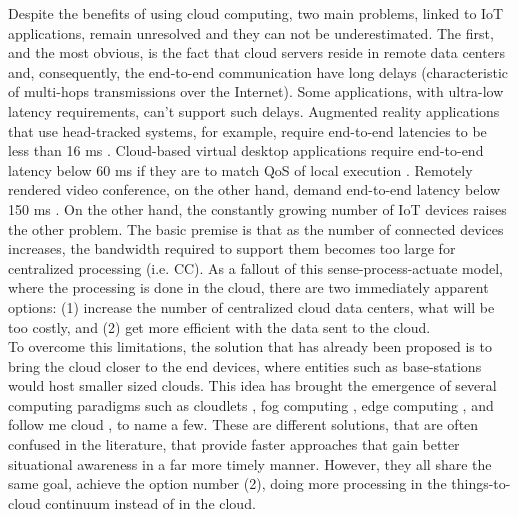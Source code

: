 \noindent\tab Despite the benefits of using cloud computing, two main problems, linked to IoT applications, remain unresolved and they can not be underestimated. The first, and the most obvious, is the fact that cloud servers reside in remote data centers and, consequently, the end-to-end communication have long delays (characteristic of multi-hops transmissions over the Internet). Some applications, with ultra-low latency requirements, can't support such delays. Augmented reality applications that use head-tracked systems, for example, require end-to-end latencies to be less than 16 ms \cite{ellis2004generalizeability}. Cloud-based virtual desktop applications require end-to-end latency below 60 ms if they are to match QoS of local execution \cite{taylor2015virtual}. Remotely rendered video conference, on the other hand, demand end-to-end latency below 150 ms \cite{szigeti2005end}. On the other hand, the constantly growing number of IoT devices raises the other problem. The basic premise is that as the number of connected devices increases, the bandwidth required to support them becomes too large for centralized processing (i.e. CC). As a fallout of this sense-process-actuate model, where the processing is done in the cloud, there are two immediately apparent options: (1) increase the number of centralized cloud data centers, what will be too costly, and (2) get more efficient with the data sent to the cloud.\\
\noindent\tab To overcome this limitations, the solution that has already been proposed is to bring the cloud closer to the end devices, where entities such as base-stations would host smaller sized clouds. This idea has brought the emergence of several computing paradigms such as cloudlets \cite{satyanarayanan2013cloudlets}, fog computing \cite{bonomi2012fog}, edge computing \cite{davy2014challenges}, and follow me cloud \cite{taleb2013follow}, to name a few. These are different solutions, that are often confused in the literature, that provide faster approaches that gain better situational awareness in a far more timely manner. However, they all share the same goal, achieve the option number (2), doing more processing in the things-to-cloud continuum instead of in the cloud.\\
